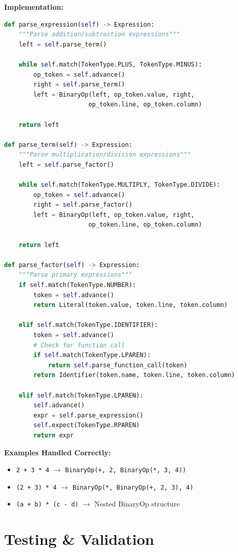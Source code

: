 \documentclass[a4paper,11pt]{article}
\begin{document}
\textbf{Implementation:}

\begin{lstlisting}[language=Python, caption=Expression Parsing with Precedence]
def parse_expression(self) -> Expression:
    """Parse addition/subtraction expressions"""
    left = self.parse_term()
    
    while self.match(TokenType.PLUS, TokenType.MINUS):
        op_token = self.advance()
        right = self.parse_term()
        left = BinaryOp(left, op_token.value, right,
                       op_token.line, op_token.column)
    
    return left

def parse_term(self) -> Expression:
    """Parse multiplication/division expressions"""
    left = self.parse_factor()
    
    while self.match(TokenType.MULTIPLY, TokenType.DIVIDE):
        op_token = self.advance()
        right = self.parse_factor()
        left = BinaryOp(left, op_token.value, right,
                       op_token.line, op_token.column)
    
    return left

def parse_factor(self) -> Expression:
    """Parse primary expressions"""
    if self.match(TokenType.NUMBER):
        token = self.advance()
        return Literal(token.value, token.line, token.column)
    
    elif self.match(TokenType.IDENTIFIER):
        token = self.advance()
        # Check for function call
        if self.match(TokenType.LPAREN):
            return self.parse_function_call(token)
        return Identifier(token.name, token.line, token.column)
    
    elif self.match(TokenType.LPAREN):
        self.advance()
        expr = self.parse_expression()
        self.expect(TokenType.RPAREN)
        return expr
\end{lstlisting}

\textbf{Examples Handled Correctly:}
\begin{itemize}[leftmargin=*]
    \item \texttt{2 + 3 * 4} $\rightarrow$ \texttt{BinaryOp(+, 2, BinaryOp(*, 3, 4))}
    \item \texttt{(2 + 3) * 4} $\rightarrow$ \texttt{BinaryOp(*, BinaryOp(+, 2, 3), 4)}
    \item \texttt{(a + b) * (c - d)} $\rightarrow$ Nested BinaryOp structure
\end{itemize}

\section{Testing \& Validation}
\end{document}
